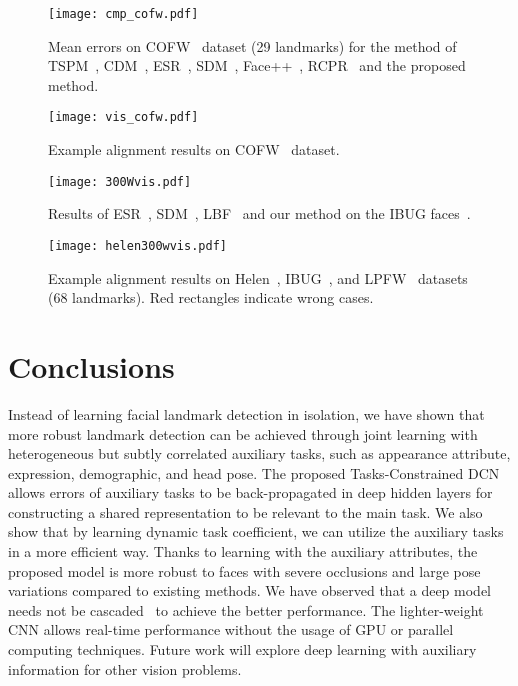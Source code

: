 \documentclass[10pt,journal,compsoc]{IEEEtran}
\begin{document}
\begin{figure}[t]
  \centering
  \texttt{[image: cmp\_cofw.pdf]}
   \vskip -0.3cm
  \caption{Mean errors on COFW~\cite{dollar13} dataset (29 landmarks) for the method of TSPM~\cite{Zhu2012}, CDM~\cite{Yu2013}, ESR~\cite{Cao2012}, SDM~\cite{6618919}, Face++~\cite{FACEPP}, RCPR~\cite{dollar13} and the proposed method.}
  \label{fig:cmp_cofw}
   \vskip -0.3cm
\end{figure}

\begin{figure}[t]
  \centering
  \texttt{[image: vis\_cofw.pdf]}
  \vskip -0.3cm
  \caption{Example alignment results on COFW~\cite{dollar13} dataset.}
  \label{fig:visual_examples_COFW}
  \vskip -0.3cm
\end{figure}

\begin{figure*}[t]
  \centering
  \texttt{[image: 300Wvis.pdf]}
  \vskip -0.3cm
  \caption{Results of ESR~\cite{Cao2012}, SDM~\cite{6618919}, LBF~\cite{300w_lbp} and our method on the IBUG faces~\cite{300w}.}
  \label{fig:visual_examples_300W}
\end{figure*}

\begin{figure*}[t]
  \centering
  \texttt{[image: helen300wvis.pdf]}
  \vskip -0.3cm
  \caption{Example alignment results on Helen~\cite{Helen}, IBUG~\cite{300w}, and LPFW~\cite{Belhumeur2011} datasets (68 landmarks). Red rectangles indicate wrong cases.}
  \label{fig:visual_examples_HELEN-IBUG-300W}
\end{figure*}
\vskip -0.6cm





\section{Conclusions}
\vskip -0.1cm
Instead of learning facial landmark detection in isolation, we have shown that more robust landmark detection can be achieved through joint learning with heterogeneous but subtly correlated auxiliary tasks, such as appearance attribute, expression, demographic, and head pose. The proposed Tasks-Constrained DCN allows errors of auxiliary tasks to be back-propagated in deep hidden layers for constructing a shared representation to be relevant to the main task. We also show that by learning dynamic task coefficient, we can utilize the auxiliary tasks in a more efficient way. Thanks to learning with the auxiliary attributes, the proposed model is more robust to faces with severe occlusions and large pose variations compared to existing methods. We have observed that a deep model needs not be cascaded~\cite{Sun2013} to achieve the better performance. The lighter-weight CNN allows real-time performance without the usage of GPU or parallel computing techniques. Future work will explore deep learning with auxiliary information for other vision problems.
\end{document}
